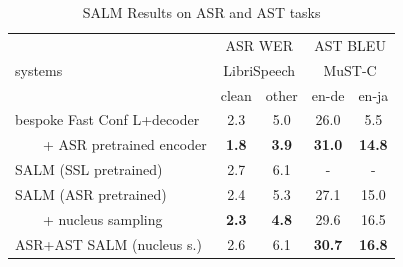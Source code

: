 \documentclass{article}
\begin{document}
\begin{table}[]
\caption{\label{tab:exp-asr} {SALM Results on ASR and AST tasks} }
\begin{tabular}{l|cc|cc}
 \toprule
                           & \multicolumn{2}{c|}{ASR WER}  & \multicolumn{2}{c}{AST BLEU} \\
    systems                      & \multicolumn{2}{c|}{LibriSpeech} & \multicolumn{2}{c}{MuST-C }  \\
                          &  clean & other & en-de & en-ja  \\
 \midrule
bespoke Fast Conf L+decoder      & 2.3        & 5.0  & 26.0 & 5.5      \\
\ \ \ \ + ASR pretrained encoder  & \textbf{1.8}        & \textbf{3.9}   & \textbf{31.0} & \textbf{14.8}      \\
\midrule
SALM (SSL pretrained)       & 2.7        & 6.1   & - & -     \\
SALM (ASR pretrained)       & 2.4        & 5.3   &  27.1 &  15.0   \\
\ \ \ \ + nucleus sampling       & \textbf{2.3}        & \textbf{4.8}  &29.6 & 16.5     \\
\midrule
ASR+AST SALM (nucleus s.)       & 2.6        & 6.1 &\textbf{30.7} & \textbf{16.8}     \\
\bottomrule
\end{tabular}
\vspace{-1.5em}
\end{table}
\end{document}
